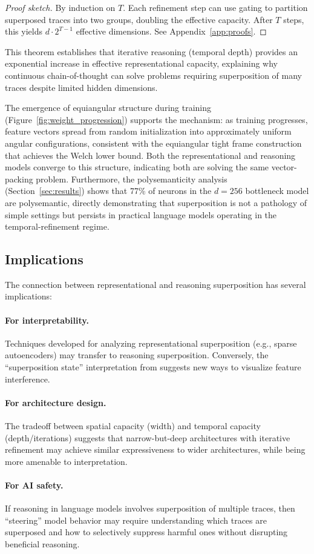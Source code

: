 \begin{proof}[Proof sketch]
By induction on $T$. Each refinement step can use gating to partition superposed traces into two groups, doubling the effective capacity. After $T$ steps, this yields $d \cdot 2^{T-1}$ effective dimensions. See Appendix~\ref{app:proofs}.
\end{proof}

This theorem establishes that iterative reasoning (temporal depth) provides an exponential increase in effective representational capacity, explaining why continuous chain-of-thought can solve problems requiring superposition of many traces despite limited hidden dimensions.

The emergence of equiangular structure during training (Figure~\ref{fig:weight_progression}) supports the mechanism: as training progresses, feature vectors spread from random initialization into approximately uniform angular configurations, consistent with the equiangular tight frame construction that achieves the Welch lower bound. Both the representational and reasoning models converge to this structure, indicating both are solving the same vector-packing problem. Furthermore, the polysemanticity analysis (Section~\ref{sec:results}) shows that 77\% of neurons in the $d=256$ bottleneck model are polysemantic, directly demonstrating that superposition is not a pathology of simple settings but persists in practical language models operating in the temporal-refinement regime.

\subsection{Implications}

The connection between representational and reasoning superposition has several implications:

\paragraph{For interpretability.} Techniques developed for analyzing representational superposition (e.g., sparse autoencoders) may transfer to reasoning superposition. Conversely, the ``superposition state'' interpretation from \citet{zhu2025reasoning} suggests new ways to visualize feature interference.

\paragraph{For architecture design.} The tradeoff between spatial capacity (width) and temporal capacity (depth/iterations) suggests that narrow-but-deep architectures with iterative refinement may achieve similar expressiveness to wider architectures, while being more amenable to interpretation.

\paragraph{For AI safety.} If reasoning in language models involves superposition of multiple traces, then ``steering'' model behavior \citep{templeton2024scaling} may require understanding which traces are superposed and how to selectively suppress harmful ones without disrupting beneficial reasoning.
